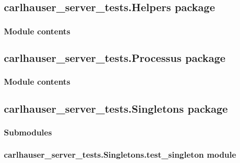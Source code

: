 \documentclass[letterpaper,10pt,english]{sphinxmanual}
\begin{document}
\subsection{carlhauser\_server\_tests.Helpers package}
\label{\detokenize{carlhauser_server_tests.Helpers:carlhauser-server-tests-helpers-package}}\label{\detokenize{carlhauser_server_tests.Helpers::doc}}

\subsubsection{Module contents}
\label{\detokenize{carlhauser_server_tests.Helpers:module-carlhauser_server_tests.Helpers}}\label{\detokenize{carlhauser_server_tests.Helpers:module-contents}}

\subsection{carlhauser\_server\_tests.Processus package}
\label{\detokenize{carlhauser_server_tests.Processus:carlhauser-server-tests-processus-package}}\label{\detokenize{carlhauser_server_tests.Processus::doc}}

\subsubsection{Module contents}
\label{\detokenize{carlhauser_server_tests.Processus:module-carlhauser_server_tests.Processus}}\label{\detokenize{carlhauser_server_tests.Processus:module-contents}}

\subsection{carlhauser\_server\_tests.Singletons package}
\label{\detokenize{carlhauser_server_tests.Singletons:carlhauser-server-tests-singletons-package}}\label{\detokenize{carlhauser_server_tests.Singletons::doc}}

\subsubsection{Submodules}
\label{\detokenize{carlhauser_server_tests.Singletons:submodules}}

\subsubsection{carlhauser\_server\_tests.Singletons.test\_singleton module}
\label{\detokenize{carlhauser_server_tests.Singletons:module-carlhauser_server_tests.Singletons.test_singleton}}\label{\detokenize{carlhauser_server_tests.Singletons:carlhauser-server-tests-singletons-test-singleton-module}}
\end{document}
